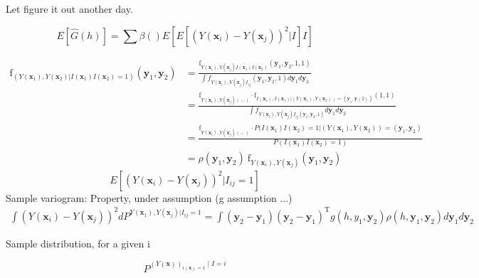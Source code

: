 \documentclass[12pt]{article}
\theoremstyle{definition}
\theoremstyle{remark}
\newcommand{\density}{\mathrm{f}}
\newcommand{\position}{\mathbf{x}}
\newcommand{\Signal}{Y}
\newcommand{\signal}{\mathbf{y}}
\begin{document}
Let figure it out another day.

\begin{equation}
    E[\hat{G}(h)]=\sum{\beta()E\left[E\left[(\Signal(\position_{i})-\Signal(\position_{j}))^{2}|I\right]I\right]}
\end{equation}

\begin{equation}
\begin{split}
    \density_{(\Signal(\position_{1}),\Signal(\position_{2})|I(\position_1)I(\position_2)=1)}\left(\signal_1,\signal_2\right)&=\frac{\density_{Y(\position_{i}),\Signal(\position_{j})I(\position_1)I(\position_2)}(\signal_1,\signal_2,1,1)}{\int{f_{Y(\position_{i}),Y(\position_{j})I_{ij}}(\signal_{1},\signal_{2},1)}d \signal_{1}d \signal_{2}}\\
    &=\frac{\density_{\Signal(\position_{i}),\Signal(\position_{j})(\cdot,\cdot)}\cdot \density_{I(\position_1),I(\position_1)|(\Signal(\position_{1}),\Signal(\position_{2}))=(\signal_1,\signal(2))}(1,1)}{\int{f_{\Signal(\position_{i}),\Signal(\position_{j})I_{ij}(\signal_{1},\signal_{2},1)}d \signal_{1}d \signal_{2}}}\\
    &=\frac{\density_{\Signal(\position_{i}),\Signal(\position_{j})(\cdot,\cdot)}\cdot P(I(\position_1)I(\position_2)=1|(\Signal(\position_{1}),\Signal(\position_{2}))=(\signal_1,\signal_2)}{P(I(\position_1)I(\position_2)=1)}\\
    &=\rho(\signal_1,\signal_2)~\density_{\Signal(\position_{i}),\Signal(\position_{j})}(\signal_1,\signal_2) 
\end{split}
\end{equation}
\begin{equation}
    E[(\Signal(\position_{i})-\Signal(\position_{j}))^2|I_{ij}=1]
\end{equation}
Sample variogram: Property, under assumption (g assumption ...)
\begin{equation}
    \begin{split}
        \int{(\Signal(\position_{i})-\Signal(\position_{j}))^2dP^{\Signal(\position_{1}),\Signal(\position_{j})|I_{ij}=1}}=\int{\left(\signal_2-\signal_1\right)\left(\signal_2-\signal_1\right)^{\mathrm{T}}g(h,y_{1},\signal_{2})\rho(h,\signal_{1},\signal_{2})d \signal_{1} d \signal_{2}}
    \end{split}
\end{equation}

Sample distribution, for a given i

$$P^{(\Signal(\position))_{i(\position)=1}\mid I=i}$$
\end{document}
